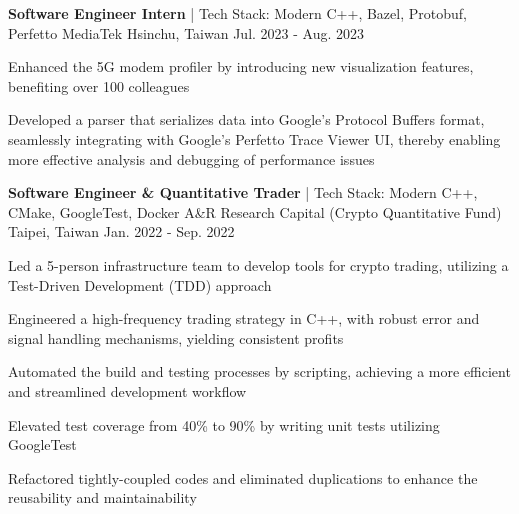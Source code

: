 

\begin{cventries}

  \cventry
    {\textbf {Software Engineer Intern} | \color{awesome} Tech Stack: Modern C++, Bazel, Protobuf, Perfetto} %
    {MediaTek} %
    {Hsinchu, Taiwan} %
    {Jul. 2023 - Aug. 2023} %
    {
      \begin{cvitems} %
        \item {Enhanced the 5G modem profiler by introducing new visualization features, benefiting over 100 colleagues}
        \item {Developed a parser that serializes data into Google's Protocol Buffers format, seamlessly integrating with Google's Perfetto Trace Viewer UI, thereby enabling more effective analysis and debugging of performance issues}
      \end{cvitems}
    }

  \cventry
    {\textbf{Software Engineer \& Quantitative Trader} | \color{awesome} Tech Stack: Modern C++, CMake, GoogleTest, Docker} %
    {A\&R Research Capital (Crypto Quantitative Fund)} %
    {Taipei, Taiwan} %
    {Jan. 2022 - Sep. 2022} %
    {
      \begin{cvitems} %
        \item Led a 5-person infrastructure team to develop tools for crypto trading, utilizing a Test-Driven Development (TDD) approach
        \item Engineered a high-frequency trading strategy in C++, with robust error and signal handling mechanisms, yielding consistent profits 
        \item Automated the build and testing processes by scripting, achieving a more efficient and streamlined development workflow
        \item Elevated test coverage from 40\% to 90\% by writing unit tests utilizing GoogleTest
        \item Refactored tightly-coupled codes and eliminated duplications to enhance the reusability and maintainability
      \end{cvitems}
    }

\end{cventries}
